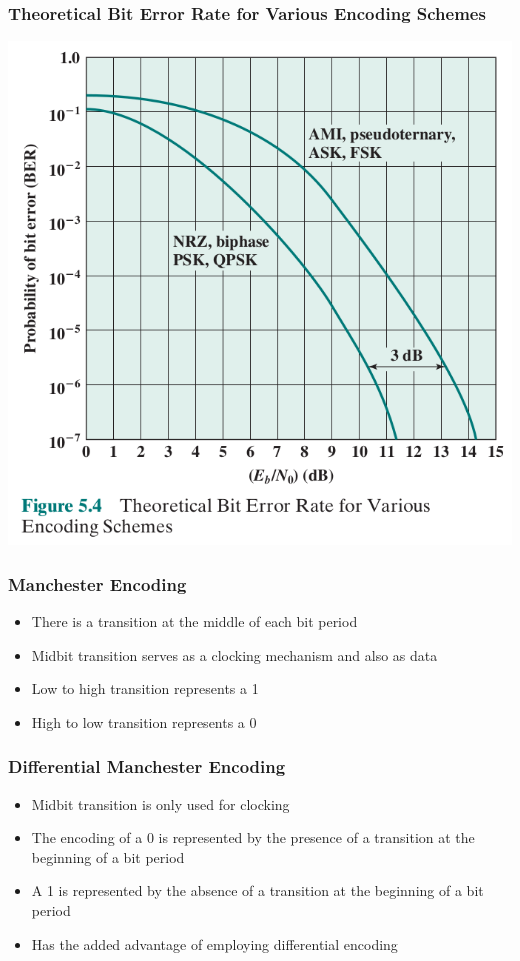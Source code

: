 \documentclass[pdflatex,compress]{beamer}
\begin{document}
\begin{frame}
	\frametitle{Theoretical Bit Error Rate for Various Encoding Schemes}
	\begin{center}
		\includegraphics[width=0.6\linewidth]{img/img06}
	\end{center}
\end{frame}

\begin{frame}
	\frametitle{Manchester Encoding}
	\begin{itemize}
		\item There is a transition at the middle of each bit period
		\item Midbit transition serves as a clocking mechanism and also as data
		\item Low to high transition represents a 1
		\item High to low transition represents a 0
	\end{itemize}
\end{frame}

\begin{frame}
	\frametitle{Differential Manchester Encoding}
	\begin{itemize}
		\item Midbit transition is only used for clocking
		\item The encoding of a 0 is represented by the presence of a transition at the beginning of a bit period
		\item A 1 is represented by the absence of a transition at the beginning of a bit period
		\item Has the added advantage of employing differential encoding
	\end{itemize}
\end{frame}
\end{document}
